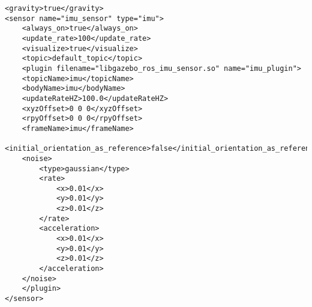 \newpage
\vspace{10pt }
\begin{minipage}{0.9\textwidth}
\begin{lstlisting}[style=xmlStyle, caption={IMU Sensor Configuration}, label={lst:imu_sensor}]
<gravity>true</gravity>
<sensor name="imu_sensor" type="imu">
    <always_on>true</always_on>
    <update_rate>100</update_rate>
    <visualize>true</visualize>
    <topic>default_topic</topic>
    <plugin filename="libgazebo_ros_imu_sensor.so" name="imu_plugin">
    <topicName>imu</topicName>
    <bodyName>imu</bodyName>
    <updateRateHZ>100.0</updateRateHZ>
    <xyzOffset>0 0 0</xyzOffset>
    <rpyOffset>0 0 0</rpyOffset>
    <frameName>imu</frameName>
    <initial_orientation_as_reference>false</initial_orientation_as_reference>
    <noise>
        <type>gaussian</type>
        <rate>
            <x>0.01</x>
            <y>0.01</y>
            <z>0.01</z>
        </rate>
        <acceleration>
            <x>0.01</x>
            <y>0.01</y>
            <z>0.01</z>
        </acceleration>
    </noise>
    </plugin>
</sensor>
\end{lstlisting}
\end{minipage}
